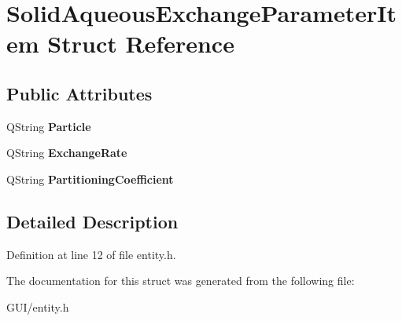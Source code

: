 \hypertarget{struct_solid_aqueous_exchange_parameter_item}{}\section{Solid\+Aqueous\+Exchange\+Parameter\+Item Struct Reference}
\label{struct_solid_aqueous_exchange_parameter_item}
\subsection*{Public Attributes}
\begin{DoxyCompactItemize}
\item 
\mbox{\label{struct_solid_aqueous_exchange_parameter_item_acc15d3757bc17f74802df282aad15ca3}} 
Q\+String {\bfseries Particle}
\item 
\mbox{\label{struct_solid_aqueous_exchange_parameter_item_af2b0e9e2198bda69480e587db6aed0b2}} 
Q\+String {\bfseries Exchange\+Rate}
\item 
\mbox{\label{struct_solid_aqueous_exchange_parameter_item_aaca8557b9873fb157d120fa220b93ec1}} 
Q\+String {\bfseries Partitioning\+Coefficient}
\end{DoxyCompactItemize}


\subsection{Detailed Description}


Definition at line 12 of file entity.\+h.



The documentation for this struct was generated from the following file\+:\begin{DoxyCompactItemize}
\item 
G\+U\+I/entity.\+h\end{DoxyCompactItemize}
